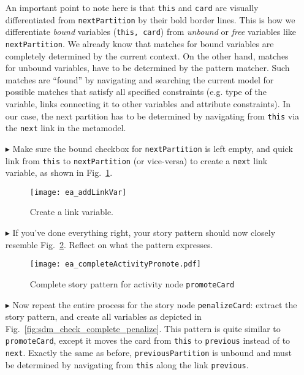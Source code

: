 \begin{itemize}
An important point to note here is that \texttt{this} and \texttt{card} are visually differentiated from \texttt{nextPartition} by their bold border lines.
This is how we differentiate \emph{bound}  variables (\texttt{this, card}) from \emph{unbound} or \emph{free} variables like
\texttt{nextPartition}. We already know that matches for bound variables are completely determined by the current context. On the other hand, matches for
unbound variables, have to be determined by the pattern matcher. Such matches are ``found'' by navigating and searching the current model for possible matches
that satisfy all specified constraints (e.g. type of the variable, links connecting it to other variables and attribute constraints). In our case, the next
partition has to be determined by navigating from \texttt{this} via the \texttt{next} link in the metamodel.  

\item[$\blacktriangleright$] Make sure the bound checkbox for \texttt{nextPartition} is left empty, and quick link from \texttt{this} to \texttt{nextPartition}
(or vice-versa) to create a \texttt{next} link variable, as shown in Fig.~\ref{fig:sdm_check_link_variable}.

\begin{figure}[htbp]
\begin{center}
  \texttt{[image: ea\_addLinkVar]}
  \caption{Create a link variable.}
  \label{fig:sdm_check_link_variable}
\end{center}
\end{figure}

\item[$\blacktriangleright$] If you've done everything right, your story pattern should now closely resemble Fig.~\ref{fig:sdm_check_complete_activity_node}. 
Reflect on what the pattern expresses.

\begin{figure}[htbp]
\begin{center}
  \texttt{[image: ea\_completeActivityPromote.pdf]}
  \caption{Complete story pattern for activity node \texttt{promoteCard}}
  \label{fig:sdm_check_complete_activity_node}
\end{center}
\end{figure}

\item[$\blacktriangleright$] Now repeat the entire process for the story node \texttt{penalizeCard}: extract the story pattern, and create all variables as
depicted in Fig.~\ref{fig:sdm_check_complete_penalize}.  This pattern is quite similar to \texttt{promoteCard}, except it moves the card from \texttt{this} to
\texttt{previous} instead of to \texttt{next}. Exactly the same as before, \texttt{previousPartition} is unbound and must be determined by navigating from \texttt{this}
along the link \texttt{previous}.


\end{itemize}
